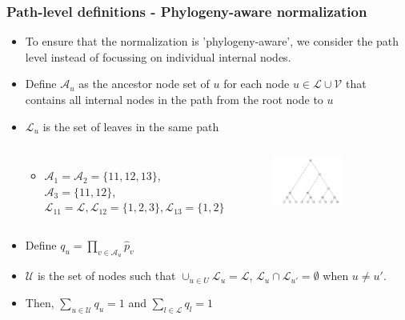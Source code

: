 \documentclass{beamer}
\begin{document}
\begin{frame}
\frametitle{Path-level definitions - Phylogeny-aware normalization }
\begin{itemize}
  \item To ensure that the normalization is 'phylogeny-aware', we consider the path level instead of focussing on individual internal nodes.
  \item Define $\mathcal{A}_u$ as the ancestor node set of $u$ for each node $u \in \mathcal{L} \cup \mathcal{V}$ that contains all internal nodes in the path from the root node to $u$
  \item $\mathcal{L}_u$ is the set of leaves in the same path
  \begin{columns}[c] %

  \begin{itemize}
    \item $\mathcal{A}_1 = \mathcal{A}_2 = \{11,12,13\}$, $\mathcal{A}_3 = \{11,12\}$, $\mathcal{L}_{11} = \mathcal{L}, \mathcal{L}_{12} = \{1,2,3\}, \mathcal{L}_{13} = \{1,2\}$
  \end{itemize}

  \begin{figure}[!htb]
  	\centering
  	\includegraphics[width=0.65\textwidth]{img/ex2.png}
  \end{figure}

  \end{columns}
  \item Define $q_u = \prod_{v \in \mathcal{A}_u}\hat p_v$
  \item $\mathcal{U}$ is the set of nodes such that $\cup_{u \in U} \mathcal{L}_u = \mathcal{L}$, $\mathcal{L}_u \cap \mathcal{L}_{u'} = \emptyset$ when $u \neq u'$.
  \item Then, $\sum_{u \in \mathcal{U}} q_u = 1$ and $\sum_{l \in \mathcal{L}} q_l = 1$
\end{itemize}
\end{frame}
\end{document}
